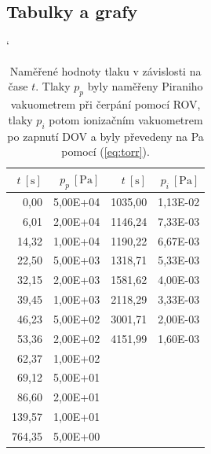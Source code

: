 \documentclass[english]{article}
\newcommand{\unit}[1]{~\mathrm{#1}}
\begin{document}
\clearpage

\subsection{Tabulky a grafy}

\begin{table}[htbp]
\catcode` %
  \centering
    \begin{tabular}{|r|r|r|r|}
    \hline
    \boldmath{}\textbf{$t\unit{[s]}$}\unboldmath{} & \boldmath{}\textbf{$p_p\unit{[Pa]}$}\unboldmath{} & \boldmath{}\textbf{$t\unit{[s]}$}\unboldmath{} & \boldmath{}\textbf{$p_i\unit{[Pa]}$}\unboldmath{} \bigstrut\\
    \hline
    0,00  & 5,00E+04 & 1035,00 & 1,13E-02 \bigstrut\\
    \hline
    6,01  & 2,00E+04 & 1146,24 & 7,33E-03 \bigstrut\\
    \hline
    14,32 & 1,00E+04 & 1190,22 & 6,67E-03 \bigstrut\\
    \hline
    22,50 & 5,00E+03 & 1318,71 & 5,33E-03 \bigstrut\\
    \hline
    32,15 & 2,00E+03 & 1581,62 & 4,00E-03 \bigstrut\\
    \hline
    39,45 & 1,00E+03 & 2118,29 & 3,33E-03 \bigstrut\\
    \hline
    46,23 & 5,00E+02 & 3001,71 & 2,00E-03 \bigstrut\\
    \hline
    53,36 & 2,00E+02 & 4151,99 & 1,60E-03 \bigstrut\\
    \hline
    62,37 & 1,00E+02 & \multicolumn{1}{r}{} & \multicolumn{1}{r}{} \bigstrut\\
\cline{1-2}    69,12 & 5,00E+01 & \multicolumn{1}{r}{} & \multicolumn{1}{r}{} \bigstrut\\
\cline{1-2}    86,60 & 2,00E+01 & \multicolumn{1}{r}{} & \multicolumn{1}{r}{} \bigstrut\\
\cline{1-2}    139,57 & 1,00E+01 & \multicolumn{1}{r}{} & \multicolumn{1}{r}{} \bigstrut\\
\cline{1-2}    764,35 & 5,00E+00 & \multicolumn{1}{r}{} & \multicolumn{1}{r}{} \bigstrut\\
\cline{1-2}    \end{tabular}%
  
  \caption{Naměřené hodnoty tlaku v závislosti na čase $t$. Tlaky $p_p$ byly naměřeny Piraniho vakuometrem při čerpání pomocí ROV, tlaky $p_i$ potom ionizačním vakuometrem po zapnutí DOV a byly převedeny na Pa pomocí (\ref{eq:torr}).}
  
  \label{tab:tlak}%
\end{table}%
\end{document}
